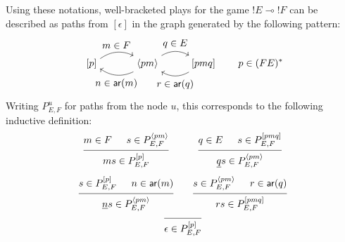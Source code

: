 \documentclass[format=sigplan,authordraft]{acmart}
\newcommand{\kw}[1]{\ensuremath{ \mathsf{#1} }}
\begin{document}
Using these notations,
well-bracketed plays
for the game ${!E} \multimap {!F}$
can be described as paths from $[\epsilon]$
in the graph
generated by the following pattern:
\[
  \begin{tikzpicture}[scale=2,baseline=(S.base)]
    \node (S) at (0,0) {$[p]$};
    \node (M) at (1,0) {$\langle pm \rangle$};
    \node (P) at (2,0) {$[pmq]$};
    \path [->] (S) edge[bend left] node[above] {$m \in F$} (M);
    \path [->] (M) edge[bend left] node[above] {$q \in E$} (P);
    \path [->] (P) edge[bend left] node[below] {$r \in \kw{ar}(q)$} (M);
    \path [->] (M) edge[bend left] node[below] {$n \in \kw{ar}(m)$} (S);
  \end{tikzpicture}
  \qquad
  p \in (FE)^*
\]
Writing $P_{E,F}^u$ for paths from the node $u$,
this corresponds to the following inductive definition:
\begin{gather*}
  \begin{array}{c@{\qquad}c}
    {\begin{prooftree}
      \hypo{m \in F}
      \hypo{s \in P_{E,F}^{\langle pm \rangle}}
      \infer2{ms \in P_{E,F}^{[p]}}
    \end{prooftree}} &
    {\begin{prooftree}
      \hypo{q \in E}
      \hypo{s \in P_{E,F}^{[pmq]}}
      \infer2{\underline{q}s \in P_{E,F}^{\langle pm \rangle}}
    \end{prooftree}} \\[2em]
    {\begin{prooftree}
      \hypo{s \in P_{E,F}^{[p]}}
      \hypo{n \in \kw{ar}(m)}
      \infer2{\underline{n}s \in P_{E,F}^{\langle pm \rangle}}
    \end{prooftree}} &
    {\begin{prooftree}
      \hypo{s \in P_{E,F}^{\langle pm \rangle}}
      \hypo{r \in \kw{ar}(q)}
      \infer2{rs \in P_{E,F}^{[pmq]}}
    \end{prooftree}}
  \end{array}
  \\
  {\begin{prooftree}
    \infer0{\epsilon \in P_{E,F}^{[p]}}
  \end{prooftree}}
\end{gather*}
\end{document}
